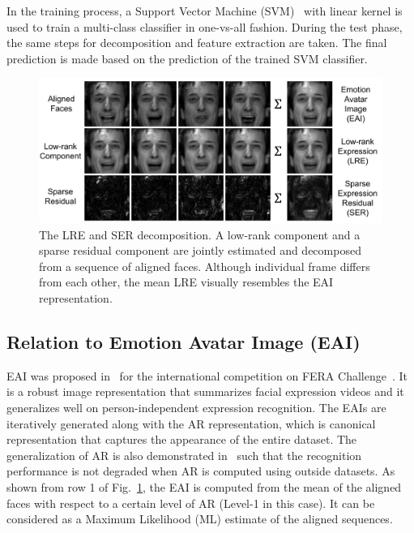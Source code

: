 \documentclass[journal]{IEEEtran}
\begin{document}
In the training process, a Support Vector Machine (SVM)~\cite{libsvm} with linear kernel is used to train a multi-class classifier in one-vs-all fashion. During the test phase, the same steps for decomposition and feature extraction are taken. The final prediction is made based on the prediction of the trained SVM classifier.  

\begin{figure}[!t]
	\centering
		\includegraphics[width=\columnwidth]{pics/low_rank_sparse}
	\caption{The LRE and SER decomposition. A low-rank component and a sparse residual component are jointly estimated and decomposed from a sequence of aligned faces. Although individual frame differs from each other, the mean LRE visually resembles the EAI representation.}
	\label{fig:low_rank_sparse}
\end{figure}

\subsection{Relation to Emotion Avatar Image (EAI) \label{sec:eai}}

EAI was proposed in~\cite{Yang_SMCB12} for the international competition on FERA Challenge~\cite{FERA11}. It is a robust image representation that summarizes facial expression videos and it generalizes well on person-independent expression recognition. The EAIs are iteratively generated along with the AR representation, which is canonical representation that captures the appearance of the entire dataset. The generalization of AR is also demonstrated in~\cite{Yang_SMCB12} such that the recognition performance is not degraded when AR is computed using outside datasets. As shown from row 1 of Fig.~\ref{fig:low_rank_sparse}, the EAI is computed from the mean of the aligned faces with respect to a certain level of AR (Level-1 in this case). It can be considered as a Maximum Likelihood (ML) estimate of the aligned sequences. 
\end{document}
